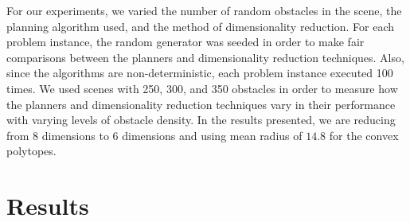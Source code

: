 \documentclass[12pt]{article}
\begin{document}
For our experiments, we varied the number of random obstacles in the scene, the
planning algorithm used, and the method of dimensionality reduction. For each
problem instance, the random generator was seeded in order to make fair
comparisons between the planners and dimensionality reduction techniques.
Also, since the algorithms are non-deterministic, each problem instance
executed 100 times. We used scenes with 250, 300, and 350 obstacles in order to
measure how the planners and dimensionality reduction techniques vary in their
performance with varying levels of obstacle density. In the results presented,
we are reducing from 8 dimensions to 6 dimensions and using mean radius of
$14.8$ for the convex polytopes.

\section{Results}
\end{document}
